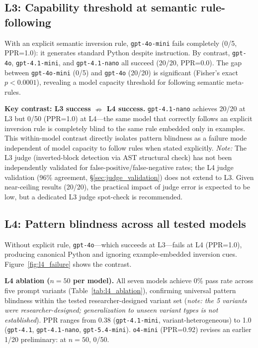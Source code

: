 \subsection{L3: Capability threshold at semantic rule-following}
With an explicit semantic inversion rule, \texttt{gpt-4o-mini} fails completely (0/5, PPR=1.0): it generates standard Python despite instruction. By contrast, \texttt{gpt-4o}, \texttt{gpt-4.1-mini}, and \texttt{gpt-4.1-nano} all succeed (20/20, PPR=0.0). The gap between \texttt{gpt-4o-mini} (0/5) and \texttt{gpt-4o} (20/20) is significant (Fisher's exact $p < 0.0001$), revealing a model capacity threshold for following semantic meta-rules.

\textbf{Key contrast: L3 success $\nRightarrow$ L4 success.} \texttt{gpt-4.1-nano} achieves 20/20 at L3 but 0/50 (PPR=1.0) at L4---the same model that correctly follows an explicit inversion rule is completely blind to the same rule embedded only in examples. This within-model contrast directly isolates pattern blindness as a failure mode independent of model capacity to follow rules when stated explicitly. \textit{Note:} The L3 judge (inverted-block detection via AST structural check) has not been independently validated for false-positive/false-negative rates; the L4 judge validation (96\% agreement, \S\ref{sec:judge_validation}) does not extend to L3. Given near-ceiling results (20/20), the practical impact of judge error is expected to be low, but a dedicated L3 judge spot-check is recommended.

\subsection{L4: Pattern blindness across all tested models}
\label{sec:l4_ablation}
Without explicit rule, \texttt{gpt-4o}---which succeeds at L3---fails at L4 (PPR=1.0), producing canonical Python and ignoring example-embedded inversion cues. Figure~\ref{fig:l4_failure} shows the contrast.

\textbf{L4 ablation ($n{=}50$ per model).}
All seven models achieve 0\% pass rate across five prompt variants (Table~\ref{tab:l4_ablation}), confirming universal pattern blindness within the tested researcher-designed variant set (\textit{note: the 5 variants were researcher-designed; generalization to unseen variant types is not established}). PPR ranges from 0.38 (\texttt{gpt-4.1-mini}, variant-heterogeneous) to 1.0 (\texttt{gpt-4.1}, \texttt{gpt-4.1-nano}, \texttt{gpt-5.4-mini}). \texttt{o4-mini} (PPR=0.92) revises an earlier 1/20 preliminary: at $n{=}50$, 0/50.

